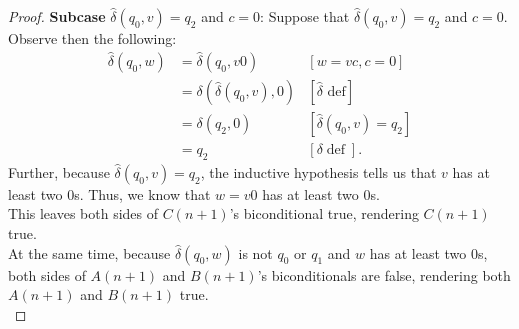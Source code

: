 \documentclass[10pt]{article}
\begin{document}
\begin{enumerate}[label={}]
\begin{proof}
                  \textbf{Subcase }$\hat{\delta}\left(q_0, v\right)=q_2$ and $c=0$: Suppose that $\hat{\delta}\left(q_0, v\right)=q_2$ and $c=0$. Observe then the following:
                  $$
                        \begin{aligned}
                              \hat{\delta}\left(q_0, w\right) & =\hat{\delta}\left(q_0, v 0\right)                    & {[w=v c, c=0] }                                     \\
                                                              & =\delta\left(\hat{\delta}\left(q_0, v\right),0\right) & {[\hat{\delta} \text { def}] }                      \\
                                                              & =\delta\left(q_2, 0\right)                            & {\left[\hat{\delta}\left(q_0, v\right)=q_2\right] } \\
                                                              & =q_2                                                  & {[\delta \operatorname{def}] . }
                        \end{aligned}
                  $$
                  Further, because $\hat{\delta}\left(q_0, v\right)=q_2$, the inductive hypothesis tells us that $v$ has at least two 0s. Thus, we know that $w=v0$ has at least two 0s.\\
                  This leaves both sides of $C(n+1)$'s biconditional true, rendering $C(n+1)$ true.\\
                  At the same time, because $\hat{\delta}\left(q_0, w\right)$ is not $q_0$ or $q_1$ and $w$ has at least two 0s, both sides of $A(n+1)$ and $B(n+1)$'s biconditionals are false, rendering both $A(n+1)$ and $B(n+1)$ true.\\


\end{proof}
\end{enumerate}
\end{document}
